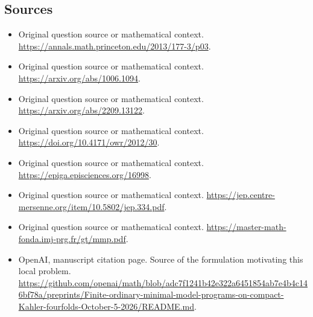 \documentclass[11pt]{article}
\begin{document}
\subsection{Sources}
\begin{itemize}
\item[S1] Original question source or mathematical context.
\url{https://annals.math.princeton.edu/2013/177-3/p03}.
\item[S2] Original question source or mathematical context.
\url{https://arxiv.org/abs/1006.1094}.
\item[S3] Original question source or mathematical context.
\url{https://arxiv.org/abs/2209.13122}.
\item[S4] Original question source or mathematical context.
\url{https://doi.org/10.4171/owr/2012/30}.
\item[S5] Original question source or mathematical context.
\url{https://epiga.episciences.org/16998}.
\item[S6] Original question source or mathematical context.
\url{https://jep.centre-mersenne.org/item/10.5802/jep.334.pdf}.
\item[S7] Original question source or mathematical context.
\url{https://master-math-fonda.imj-prg.fr/gt/mmp.pdf}.
\item[S8] OpenAI, manuscript citation page. Source of the formulation motivating this local problem.
\url{https://github.com/openai/math/blob/adc7f1241b42e322a6451854ab7e4b4c146bf78a/preprints/Finite-ordinary-minimal-model-programs-on-compact-Kahler-fourfolds-October-5-2026/README.md}.
\end{itemize}
\end{document}
